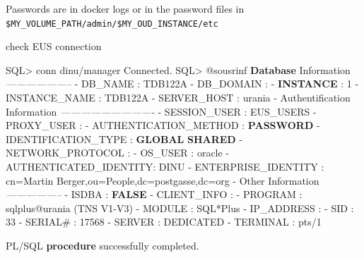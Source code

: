 \documentclass[a4paper,,tablecaptionabove]{scrartcl}
\newenvironment{Shaded}{}{}
\newcommand{\CommentTok}[1]{\textcolor[rgb]{0.38,0.63,0.69}{\textit{#1}}}
\newcommand{\DecValTok}[1]{\textcolor[rgb]{0.25,0.63,0.44}{#1}}
\newcommand{\ExtensionTok}[1]{#1}
\newcommand{\KeywordTok}[1]{\textcolor[rgb]{0.00,0.44,0.13}{\textbf{#1}}}
\newcommand{\NormalTok}[1]{#1}
\newcommand{\OperatorTok}[1]{\textcolor[rgb]{0.40,0.40,0.40}{#1}}
\newcommand{\StringTok}[1]{\textcolor[rgb]{0.25,0.44,0.63}{#1}}
\newcommand{\VariableTok}[1]{\textcolor[rgb]{0.10,0.09,0.49}{#1}}
\begin{document}
\begin{Shaded}
\end{Shaded}

Passwords are in docker logs or in the password files in
\texttt{\$MY\_VOLUME\_PATH/admin/\$MY\_OUD\_INSTANCE/etc}

check EUS connection

\begin{Shaded}
\begin{Highlighting}[]
\NormalTok{SQL}\OperatorTok{>}\NormalTok{ conn dinu}\OperatorTok{/}\NormalTok{manager}
\NormalTok{Connected.}
\NormalTok{SQL}\OperatorTok{>}\NormalTok{ @sousrinf}
\KeywordTok{Database}\NormalTok{ Information}
\CommentTok{--------------------}
\OperatorTok{-}\NormalTok{ DB_NAME       : TDB122A}
\OperatorTok{-}\NormalTok{ DB_DOMAIN     :}
\OperatorTok{-} \KeywordTok{INSTANCE}\NormalTok{      : }\DecValTok{1}
\OperatorTok{-}\NormalTok{ INSTANCE_NAME     : TDB122A}
\OperatorTok{-}\NormalTok{ SERVER_HOST       : urania}
\OperatorTok{-}
\NormalTok{Authentification Information}
\CommentTok{----------------------------}
\OperatorTok{-}\NormalTok{ SESSION_USER      : EUS_USERS}
\OperatorTok{-}\NormalTok{ PROXY_USER        :}
\OperatorTok{-}\NormalTok{ AUTHENTICATION_METHOD : }\KeywordTok{PASSWORD}
\OperatorTok{-}\NormalTok{ IDENTIFICATION_TYPE   : }\KeywordTok{GLOBAL} \KeywordTok{SHARED}
\OperatorTok{-}\NormalTok{ NETWORK_PROTOCOL  :}
\OperatorTok{-}\NormalTok{ OS_USER       : oracle}
\OperatorTok{-}\NormalTok{ AUTHENTICATED_IDENTITY: DINU}
\OperatorTok{-}\NormalTok{ ENTERPRISE_IDENTITY   : cn}\OperatorTok{=}\NormalTok{Martin Berger,ou}\OperatorTok{=}\NormalTok{People,dc}\OperatorTok{=}\NormalTok{postgasse,dc}\OperatorTok{=}\NormalTok{org}
\OperatorTok{-}
\NormalTok{Other Information}
\CommentTok{-----------------}
\OperatorTok{-}\NormalTok{ ISDBA         : }\KeywordTok{FALSE}
\OperatorTok{-}\NormalTok{ CLIENT_INFO       :}
\OperatorTok{-}\NormalTok{ PROGRAM       : sqlplus@urania (TNS V1}\OperatorTok{-}\NormalTok{V3)}
\OperatorTok{-}\NormalTok{ MODULE        : SQL}\OperatorTok{*}\NormalTok{Plus}
\OperatorTok{-}\NormalTok{ IP_ADDRESS        :}
\OperatorTok{-}\NormalTok{ SID           : }\DecValTok{33}
\OperatorTok{-}\NormalTok{ SERIAL#       : }\DecValTok{17568}
\OperatorTok{-}\NormalTok{ SERVER        : DEDICATED}
\OperatorTok{-}\NormalTok{ TERMINAL      : pts}\OperatorTok{/}\DecValTok{1}

\NormalTok{PL}\OperatorTok{/}\NormalTok{SQL }\KeywordTok{procedure}\NormalTok{ successfully completed.}
\end{Highlighting}
\end{Shaded}
\end{document}
